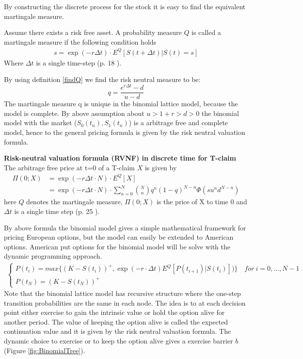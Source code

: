 By constructing the discrete process for the stock it is easy to find the equivalent martingale measure. 
\begin{definition}\label{findQ}
Assume there exists a risk free asset. A probability measure $Q$ is called a martingale measure if the following condition holds 
\begin{align}
s= \exp(- r \Delta t) \cdot E^Q[S(t+\Delta t)|S(t)=s] 
\end{align}
Where $\Delta t$ is a single time-step (p. 18 \parencite{Bjork19}).
\end{definition}
By using definition \ref{findQ} we find the risk neutral measure to be:
$$q=\frac{e^{r \Delta t}-d}{u-d}$$
The martingale measure q is unique in the binomial lattice model, because the model is complete. By above assumption about $u>1+r>d>0$ the binomial model with the market ($S_0(t_n), S_1(t_n)$) is a arbitrage free and complete model, hence to the general pricing formula is given by the risk neutral valuation formula.
\begin{theorem}\label{RNVF-Discrete}
\textbf{Risk-neutral valuation formula (RVNF) in discrete time for T-claim}
The arbitrage free price at t=0 of a T-claim $X$ is given by
\begin{align}
\Pi(0;X)&= \exp(- r \Delta t \cdot N) \cdot E^Q[X]\\
&=\exp(- r \Delta t \cdot N) \cdot \sum_{n=0}^{N} \binom{N}{n} q^n (1-q)^{N-n} \Phi(su^n d^{N-n})
\end{align}
here $Q$ denotes the martingale measure, $\Pi(0;X)$ is the price of X to time 0 and $\Delta t$ is a single time step (p. 25 \parencite{Bjork19}).
\end{theorem}

By above formula the binomial model gives a simple mathematical framework for pricing European options, but the model can easily be extended to American options. American put options for the binomial model will be solve with the dynamic programming approach. 
\begin{equation}\label{BellmanEq2}
\begin{split}
\begin{cases}
          P(t_i) = max\{ (K-S(t_i))^+, \exp(-r\cdot \Delta t) E^Q[P(t_{i+1})|S(t_i)])\} \quad for \ i={0,\ldots,N-1} \\
          P(t_N) = (K-S(t_N))^+ 
\end{cases}
\end{split}
\end{equation}
Note that the binomial lattice model has recursive structure where the one-step transition probabilities are the same in each node. The idea is to at each decision point either exercise to gain the intrinsic value or hold the option alive for another period. The value of keeping the option alive is called the expected continuation value and it is given by the risk neutral valuation formula. The dynamic choice to exercise or to keep the option alive gives a exercise barrier $b$ (Figure \ref{fig:BinomialTree}).\\

